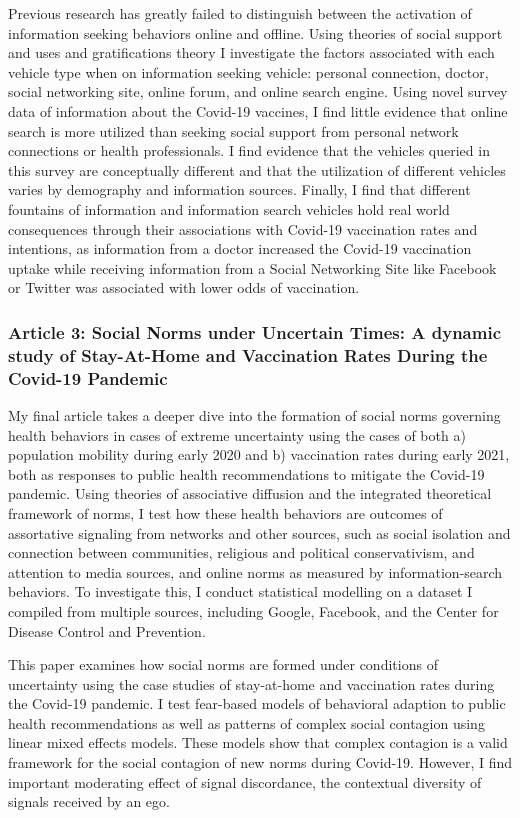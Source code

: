 Previous research has greatly failed to distinguish between the activation of
information seeking behaviors online and offline. Using theories of social
support and uses and gratifications theory I investigate the factors associated
with each vehicle type when on information seeking vehicle: personal connection,
doctor, social networking site, online forum, and online search engine. Using
novel survey data of %
information about the Covid-19 vaccines, I find little evidence that online
search is more utilized than seeking social support from personal network
connections or health professionals. I find evidence that the vehicles queried
in this survey are conceptually different and that the utilization of different
vehicles varies by demography and information sources. Finally, I find that
different fountains of information and information search vehicles hold real
world consequences through their associations with Covid-19 vaccination rates
and intentions, as information from a doctor increased the Covid-19 vaccination
uptake while receiving information from a Social Networking Site like Facebook
or Twitter was associated with lower odds of vaccination.  

\subsubsection{Article 3: Social Norms under Uncertain Times: A dynamic study of Stay-At-Home and Vaccination Rates During the Covid-19 Pandemic}
My final article takes a deeper dive into the formation of social norms
governing health behaviors in cases of extreme uncertainty using the
cases of both a) population mobility during early 2020 and b)
vaccination rates during early 2021, both as responses to public health
recommendations to mitigate the Covid-19 pandemic. Using theories of
associative diffusion and the integrated theoretical framework of norms,
I test how these health behaviors are outcomes of assortative signaling
from networks and other sources, such as social isolation and connection
between communities, religious and political conservativism, and
attention to media sources, and online norms as measured by
information-search behaviors. To investigate this, I conduct statistical
modelling on a dataset I compiled from multiple sources, including
Google, Facebook, and the Center for Disease Control and Prevention.

This paper examines how social norms are formed under conditions of uncertainty
using the case studies of stay-at-home and vaccination rates during the Covid-19
pandemic.  I test fear-based models of behavioral adaption to public health
recommendations as well as patterns of complex social contagion using linear
mixed effects models. These models show that complex contagion is a valid
framework for the social contagion of new norms during Covid-19. However, I find
important moderating effect of signal discordance, the contextual diversity of
signals received by an ego.
